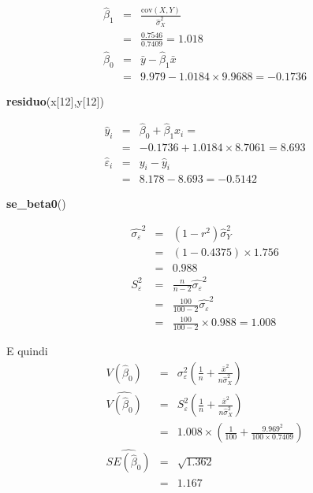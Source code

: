 \documentclass[
  11pt,
]{book}
\newenvironment{Shaded}{\begin{snugshade}}{\end{snugshade}}
\newcommand{\DecValTok}[1]{\textcolor[rgb]{0.00,0.00,0.81}{#1}}
\newcommand{\FunctionTok}[1]{\textcolor[rgb]{0.13,0.29,0.53}{\textbf{#1}}}
\newcommand{\NormalTok}[1]{#1}
\theoremstyle{mytheoremstyle}
\theoremstyle{mydefstyle}
\begin{document}
\begin{eqnarray*}
       \hat\beta_1 &=& \frac{\text{cov}(X,Y)}{\hat\sigma_X^2} \\
            &=& \frac{ 0.7546 }{ 0.7409 }  =  1.018 \\
      \hat\beta_0 &=& \bar y - \hat\beta_1 \bar x\\
          &=&  9.979 - 1.0184 \times  9.9688 = -0.1736 
      \end{eqnarray*}

\begin{Shaded}
\begin{Highlighting}[]
\FunctionTok{residuo}\NormalTok{(x[}\DecValTok{12}\NormalTok{],y[}\DecValTok{12}\NormalTok{])}
\end{Highlighting}
\end{Shaded}

\begin{eqnarray*}
\hat y_i &=&\hat\beta_0+\hat\beta_1 x_i=\\ 
&=& -0.1736 + 1.0184 \times 8.7061 = 8.693 \\ 
\hat \varepsilon_i &=& y_i-\hat y_i\\ 
&=& 8.178 - 8.693 = -0.5142  
\end{eqnarray*}

\begin{Shaded}
\begin{Highlighting}[]
\FunctionTok{se\_beta0}\NormalTok{()}
\end{Highlighting}
\end{Shaded}

\begin{eqnarray*}
\hat{\sigma_\varepsilon}^2&=&(1-r^2)\hat\sigma_Y^2\\
&=& (1- 0.4375 )\times 1.756 \\
   &=&  0.988 \\
   S_\varepsilon^2 &=& \frac{n} {n-2} \hat{\sigma_\varepsilon}^2\\
   &=&  \frac{ 100 } { 100 -2} \hat{\sigma_\varepsilon}^2 \\
 &=&  \frac{ 100 } { 100 -2} \times  0.988  =  1.008  
\end{eqnarray*}

E quindi\begin{eqnarray*}
V(\hat\beta_{0}) &=& \sigma_{\varepsilon}^{2} \left( \frac{1} {n}  +  \frac{\bar{x}^{2}} {n \hat{\sigma}^{2}_{X}} \right)\\
\widehat{V(\hat\beta_{0})} &=& S_{\varepsilon}^{2}\left( \frac{1} {n}  +  \frac{\bar{x}^{2}} {n \hat{\sigma}^{2}_{X}} \right)\ \\
 &=&  1.008 \times\left( \frac{1} { 100 }  +  \frac{ 9.969 ^{2}} { 100 \times  0.7409 } \right)\\
 \widehat{SE(\hat\beta_{0})}        &=&  \sqrt{ 1.362 }\\
 &=&  1.167 
\end{eqnarray*}
\end{document}

